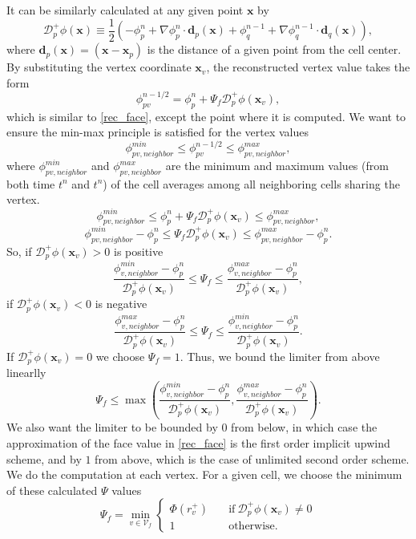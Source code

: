 \documentclass{article}
\begin{document}
It can be similarly calculated at any given point $ \boldsymbol{x} $ by
\[
	\mathcal{D}^+_p\phi (\boldsymbol{x})
	\equiv
	\frac{1}{2}(-\phi_p^n + \nabla\phi_p^n\cdot\boldsymbol{d}_p(\boldsymbol{x}) +
	\phi_q^{n-1} + \nabla\phi_q^{n-1}\cdot\boldsymbol{d}_q(\boldsymbol{x})),
\]
where $ \boldsymbol{d}_p(\boldsymbol{x}) = (\boldsymbol{x} - \boldsymbol{x}_p) $
is the distance of a given point from the cell center.
By substituting the vertex coordinate $ \boldsymbol{x}_v $,
the reconstructed vertex value takes the form
\[
	\phi_{pv}^{n-1/2} =
	\phi_p^n + \Psi_{f}\mathcal{D}^+_p\phi (\boldsymbol{x}_{v}),
\]
which is similar to \eqref{rec_face}, except the point where it is computed.
We want to ensure the min-max principle is satisfied for the vertex values
\[
	\phi_{pv, neighbor}^{min} \leq \phi_{pv}^{n-1/2} \leq \phi_{pv, neighbor}^{max},
\]
where $ \phi_{pv, neighbor}^{min} $ and $ \phi_{pv, neighbor}^{max} $
are the minimum and maximum values (from both time $ t^n $ and $ t^n $)
of the cell averages among all neighboring cells sharing the vertex.
\[
	\phi_{pv, neighbor}^{min}
	\leq
	\phi_p^n + \Psi_{f}\mathcal{D}^+_p\phi (\boldsymbol{x}_{v})
	\leq
	\phi_{pv, neighbor}^{max},
\]
\[
	\phi_{pv, neighbor}^{min} -\phi_p^n
	\leq
	\Psi_{f}\mathcal{D}^+_p\phi (\boldsymbol{x}_{v})
	\leq
	\phi_{pv, neighbor}^{max} -\phi_p^n.
\]
So, if $ \mathcal{D}^+_p\phi (\boldsymbol{x}_{v}) > 0 $ is positive
\[
	\frac{\phi_{v, neighbor}^{min} - \phi_p^n}{\mathcal{D}^+_p\phi (\boldsymbol{x}_{v})}
	\leq
	\Psi_{f}
	\leq
	\frac{\phi_{v, neighbor}^{max} - \phi_p^n}{\mathcal{D}^+_p\phi (\boldsymbol{x}_{v})},
\]
if $ \mathcal{D}^+_p\phi (\boldsymbol{x}_{v}) < 0 $ is negative
\[
	\frac{\phi_{v, neighbor}^{max} - \phi_p^n}{\mathcal{D}^+_p\phi (\boldsymbol{x}_{v})}
	\leq
	\Psi_{f}
	\leq
	\frac{\phi_{v, neighbor}^{min} - \phi_p^n}{\mathcal{D}^+_p\phi (\boldsymbol{x}_{v})}.
\]
If $ \mathcal{D}^+_p\phi (\boldsymbol{x}_{v}) = 0 $ we choose $ \Psi_{f} = 1 $.
Thus, we bound the limiter from above linearlly
\[
	\Psi_{f}
	\leq
	\max \left(
		\frac{\phi_{v, neighbor}^{min} -\phi_p^n}{\mathcal{D}^+_p\phi (\boldsymbol{x}_{v})},
		\frac{\phi_{v, neighbor}^{max} -\phi_p^n}{\mathcal{D}^+_p\phi (\boldsymbol{x}_{v})}
		\right).
\]
We also want the limiter to be bounded by $ 0 $ from below,
in which case the approximation of the face value in \eqref{rec_face}
is the first order implicit upwind scheme, and by $ 1 $ from above,
which is the case of unlimited second order scheme.
We do the computation at each vertex. For a given cell,
we choose the minimum of these calculated $ \Psi $ values
\begin{equation}
	\Psi_{f} =
	\min_{v \in \mathcal{V}_{f}}
	\begin{cases}
		\Phi(r_{v}^+) \quad
		&\text{if} \ \mathcal{D}^+_p\phi (\boldsymbol{x}_{v}) \neq 0\\
		1 \quad &\text{otherwise}.
	\end{cases}
\end{equation}
\end{document}
